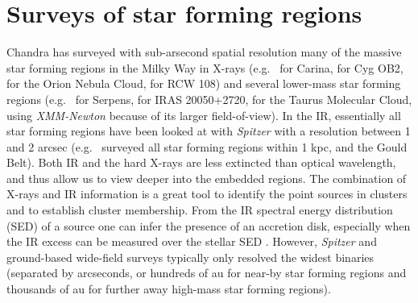 \documentclass[12pt]{article}
\begin{document}
\section{Surveys of star forming regions}
Chandra has surveyed with sub-arsecond spatial resolution  many of the massive star forming regions in the Milky Way
in X-rays (e.g.\ \citealt{2011ApJS..194....1T} for Carina,
\citealt{2010ApJ...713..871W} for Cyg OB2, \citealt{2005ApJS..160..379F} for
the Orion Nebula Cloud, \citealt{2008AJ....135..693W} for RCW 108) and 
several lower-mass star forming regions
(e.g.\ \citealt{2018AJ....155..241W} for Serpens, \citealt{2012AJ....144..101G}
for IRAS 20050+2720, \citealt{2007A&A...468..353G} for the Taurus Molecular
Cloud, using \emph{XMM-Newton} because of its larger field-of-view).  
In the IR, essentially
all star forming regions have been looked at with \emph{Spitzer} with a resolution between 1 and 2 arcsec
(e.g.\ \citealt{2009ApJS..184...18G} surveyed all star forming regions within 1
kpc, and \citealt{2015ApJS..220...11D} the Gould Belt). Both IR and the hard
X-rays are less extincted than optical wavelength, and thus allow us to view
deeper into the embedded regions. The combination of X-rays and IR information
is a great tool to identify the point sources in clusters and to establish
cluster membership. From the IR spectral energy distribution (SED) of a source one can
infer the presence of an accretion disk, especially when the IR excess can be measured over the stellar SED \citep{2009ApJS..184...18G}. However, \emph{Spitzer} and ground-based wide-field surveys typically only resolved the widest binaries (separated by arcseconds, or hundreds of au for near-by star forming regions and thousands of au for further away high-mass star forming regions).
\end{document}
